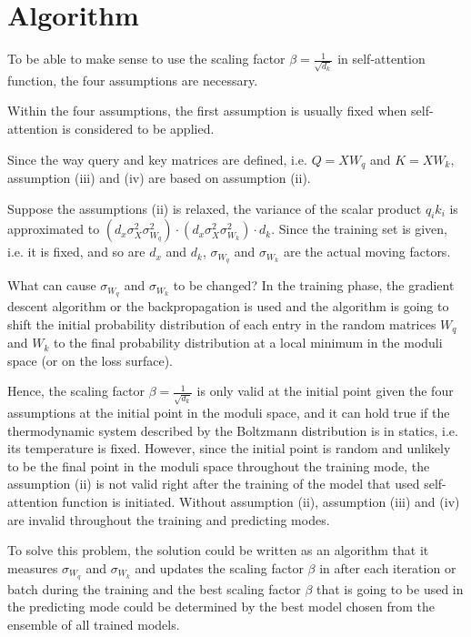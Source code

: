 \documentclass{article}
\theoremstyle{plain}
\theoremstyle{plain} %
\theoremstyle{definition}  %
\theoremstyle{remark}  %
\theoremstyle{plain}
\begin{document}
\section{Algorithm}

To be able to make sense to use the scaling factor $\beta=\frac{1}{\sqrt{d_k}}$ in self-attention function, the four assumptions are necessary. 

Within the four assumptions, the first assumption is usually fixed when self-attention is considered to be applied. 


Since the way query and key matrices are defined, i.e. $Q=XW_q$ and $K=XW_k$, assumption (iii) and (iv) are based on assumption (ii).

Suppose the assumptions (ii) is relaxed, the variance of the scalar product $q_ik_i$ is approximated to $\left( d_x \sigma_X^2 \sigma_{W_q}^2\right)\cdot\left(d_x \sigma_X^2 \sigma_{W_k}^2\right)\cdot d_k$. Since the training set is given, i.e. it is fixed, and so are $d_x$ and $d_k$, $\sigma_{W_q}$ and $\sigma_{W_k}$ are the actual moving factors. 

What can cause $\sigma_{W_q}$ and $\sigma_{W_k}$ to be changed? In the training phase, the gradient descent algorithm or the backpropagation is used and the algorithm is going to shift the initial probability distribution of each entry in the random matrices $W_q$ and $W_k$ to the final probability distribution at a local minimum in the moduli space (or on the loss surface).

Hence, the scaling factor $\beta=\frac{1}{\sqrt{d_k}}$ is only valid at the initial point given the four assumptions at the initial point in the moduli space, and it can hold true if the thermodynamic system described by the Boltzmann distribution is in statics, i.e. its temperature is fixed. However, since the initial point is random and unlikely to be the final point in the moduli space throughout the training mode, the assumption (ii) is not valid right after the training of the model that used self-attention function is initiated. Without assumption (ii), assumption (iii) and (iv) are invalid throughout the training and predicting modes.


To solve this problem, the solution could be written as an algorithm that it measures $\sigma_{W_q}$ and $\sigma_{W_k}$ and updates the scaling factor $\beta$ in after each iteration or batch during the training and the best scaling factor $\beta$ that is going to be used in the predicting mode could be determined by the best model chosen from the ensemble of all trained models.
\end{document}
